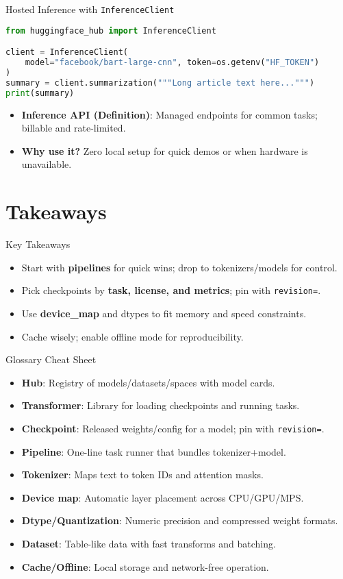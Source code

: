 \documentclass[aspectratio=169]{beamer}
\begin{document}
\begin{frame}[fragile]{Hosted Inference with \texttt{InferenceClient}}
  \begin{lstlisting}[language=Python]
from huggingface_hub import InferenceClient

client = InferenceClient(
    model="facebook/bart-large-cnn", token=os.getenv("HF_TOKEN")
)
summary = client.summarization("""Long article text here...""")
print(summary)
  \end{lstlisting}
  \begin{itemize}
    \item \textbf{Inference API (Definition)}: Managed endpoints for common tasks; billable and rate-limited.
    \item \textbf{Why use it?} Zero local setup for quick demos or when hardware is unavailable.
  \end{itemize}
\end{frame}

\section{Takeaways}

\begin{frame}{Key Takeaways}
  \begin{itemize}
    \item Start with \textbf{pipelines} for quick wins; drop to tokenizers/models for control.
    \item Pick checkpoints by \textbf{task, license, and metrics}; pin with \texttt{revision=}.
    \item Use \textbf{device\_map} and dtypes to fit memory and speed constraints.
    \item Cache wisely; enable offline mode for reproducibility.
  \end{itemize}
\end{frame}

\begin{frame}{Glossary Cheat Sheet}
  \begin{itemize}
    \item \textbf{Hub}: Registry of models/datasets/spaces with model cards.
    \item \textbf{Transformer}: Library for loading checkpoints and running tasks.
    \item \textbf{Checkpoint}: Released weights/config for a model; pin with \texttt{revision=}.
    \item \textbf{Pipeline}: One-line task runner that bundles tokenizer+model.
    \item \textbf{Tokenizer}: Maps text to token IDs and attention masks.
    \item \textbf{Device map}: Automatic layer placement across CPU/GPU/MPS.
    \item \textbf{Dtype/Quantization}: Numeric precision and compressed weight formats.
    \item \textbf{Dataset}: Table-like data with fast transforms and batching.
    \item \textbf{Cache/Offline}: Local storage and network-free operation.
  \end{itemize}
\end{frame}
\end{document}
